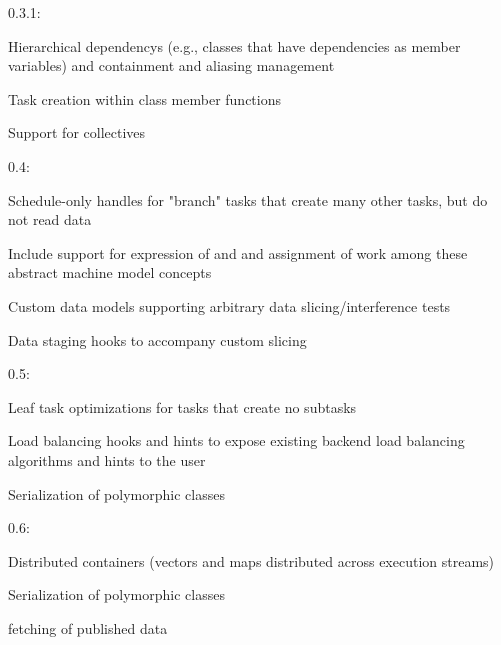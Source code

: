 \begin{compactdesc}
\item[0.3.1:]
\begin{compactitem}
\item Hierarchical \glspl{dependency} (e.g., classes that have dependencies as
member variables) and containment and aliasing management
\item Task creation within class member functions
\item Support for collectives
\end{compactitem}
\item[0.4:]
\begin{compactitem}
\item Schedule-only handles for "branch" tasks that create many other tasks, but do not read data
\item Include support for expression of  and
 and assignment of work among these abstract machine
model concepts
\item Custom data models supporting arbitrary data slicing/interference tests
\item Data staging hooks to accompany custom slicing
\end{compactitem}
\item[0.5:]
\begin{compactitem}
\item Leaf task optimizations for tasks that create no subtasks
\item Load balancing hooks and hints to expose existing backend load balancing algorithms and hints to the user
\item Serialization of polymorphic classes
\end{compactitem}
\item[0.6:]
\begin{compactitem}
\item Distributed containers (vectors and maps distributed across execution streams)
\item Serialization of polymorphic classes
\item {} \gls{fetch}ing of published data
\end{compactitem}
\end{compactdesc}
